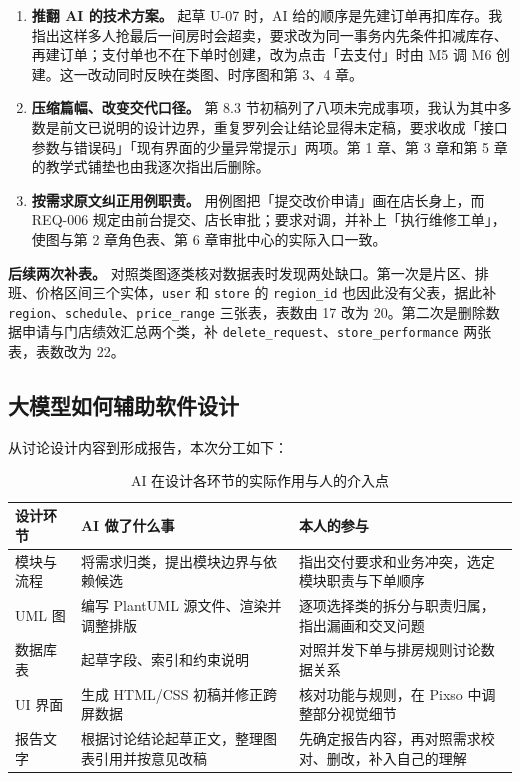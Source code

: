 \begin{enumerate}[leftmargin=3.2em]
  \item \textbf{推翻 AI 的技术方案。} 起草 U-07 时，AI 给的顺序是先建订单再扣库存。我指出这样多人抢最后一间房时会超卖，要求改为同一事务内先条件扣减库存、再建订单；支付单也不在下单时创建，改为点击「去支付」时由 M5 调 M6 创建。这一改动同时反映在类图、时序图和第 3、4 章。
  \item \textbf{压缩篇幅、改变交代口径。} 第 8.3 节初稿列了八项未完成事项，我认为其中多数是前文已说明的设计边界，重复罗列会让结论显得未定稿，要求收成「接口参数与错误码」「现有界面的少量异常提示」两项。第 1 章、第 3 章和第 5 章的教学式铺垫也由我逐次指出后删除。
  \item \textbf{按需求原文纠正用例职责。} 用例图把「提交改价申请」画在店长身上，而 REQ-006 规定由前台提交、店长审批；要求对调，并补上「执行维修工单」，使图与第 2 章角色表、第 6 章审批中心的实际入口一致。
\end{enumerate}

\textbf{后续两次补表。} 对照类图逐类核对数据表时发现两处缺口。第一次是片区、排班、价格区间三个实体，\texttt{user} 和 \texttt{store} 的 \texttt{region\_id} 也因此没有父表，据此补 \texttt{region}、\texttt{schedule}、\texttt{price\_range} 三张表，表数由 17 改为 20。第二次是删除数据申请与门店绩效汇总两个类，补 \texttt{delete\_request}、\texttt{store\_performance} 两张表，表数改为 22。

\subsection{大模型如何辅助软件设计}

从讨论设计内容到形成报告，本次分工如下：

\begin{table}[H]
\centering
\caption{AI 在设计各环节的实际作用与人的介入点}
\tabfont
\begin{tabularx}{\textwidth}{@{}L{2.9cm}L{4.8cm}X@{}}
\toprule
设计环节 & AI 做了什么事 & 本人的参与 \\
\midrule
模块与流程 & 将需求归类，提出模块边界与依赖候选 & 指出交付要求和业务冲突，选定模块职责与下单顺序 \\
UML 图 & 编写 PlantUML 源文件、渲染并调整排版 & 逐项选择类的拆分与职责归属，指出漏画和交叉问题 \\
数据库表 & 起草字段、索引和约束说明 & 对照并发下单与排房规则讨论数据关系 \\
UI 界面 & 生成 HTML/CSS 初稿并修正跨屏数据 & 核对功能与规则，在 Pixso 中调整部分视觉细节 \\
报告文字 & 根据讨论结论起草正文，整理图表引用并按意见改稿 & 先确定报告内容，再对照需求校对、删改，补入自己的理解 \\
\bottomrule
\end{tabularx}
\end{table}

